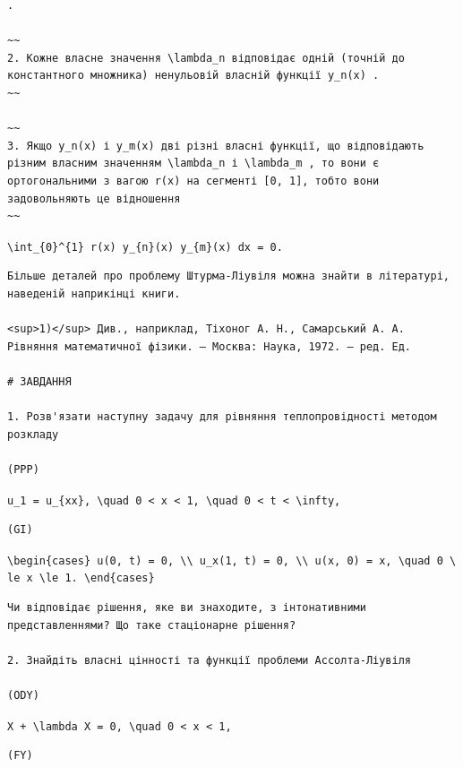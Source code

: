 \documentclass[
  ukrainian,
]{article}
\begin{document}
\begin{verbatim}
.

~~
2. Кожне власне значення \lambda_n відповідає одній (точній до константного множника) ненульовій власній функції y_n(x) .
~~

~~
3. Якщо y_n(x) і y_m(x) дві різні власні функції, що відповідають різним власним значенням \lambda_n і \lambda_m , то вони є ортогональними з вагою r(x) на сегменті [0, 1], тобто вони задовольняють це відношення
~~
\end{verbatim}

\texttt{\textbackslash{}int\_\{0\}\^{}\{1\}\ r(x)\ y\_\{n\}(x)\ y\_\{m\}(x)\ dx\ =\ 0.}

\begin{verbatim}
Більше деталей про проблему Штурма-Ліувіля можна знайти в літературі, наведеній наприкінці книги.

<sup>1)</sup> Див., наприклад, Тіхоног А. Н., Самарський А. А. Рівняння математичної фізики. — Москва: Наука, 1972. — ред. Ед.

# ЗАВДАННЯ

1. Розв'язати наступну задачу для рівняння теплопровідності методом розкладу

(PPP)
\end{verbatim}

\texttt{u\_1\ =\ u\_\{xx\},\ \textbackslash{}quad\ 0\ \textless{}\ x\ \textless{}\ 1,\ \textbackslash{}quad\ 0\ \textless{}\ t\ \textless{}\ \textbackslash{}infty,}

\begin{verbatim}
(GI)
\end{verbatim}

\texttt{\textbackslash{}begin\{cases\}\ u(0,\ t)\ =\ 0,\ \textbackslash{}\textbackslash{}\ u\_x(1,\ t)\ =\ 0,\ \textbackslash{}\textbackslash{}\ u(x,\ 0)\ =\ x,\ \textbackslash{}quad\ 0\ \textbackslash{}le\ x\ \textbackslash{}le\ 1.\ \textbackslash{}end\{cases\}}

\begin{verbatim}
Чи відповідає рішення, яке ви знаходите, з інтонативними представленнями? Що таке стаціонарне рішення?

2. Знайдіть власні цінності та функції проблеми Ассолта-Ліувіля

(ODY)
\end{verbatim}

\texttt{X\textquotesingle{}\ +\ \textbackslash{}lambda\ X\ =\ 0,\ \textbackslash{}quad\ 0\ \textless{}\ x\ \textless{}\ 1,}

\begin{verbatim}
(FY)
\end{verbatim}
\end{document}

